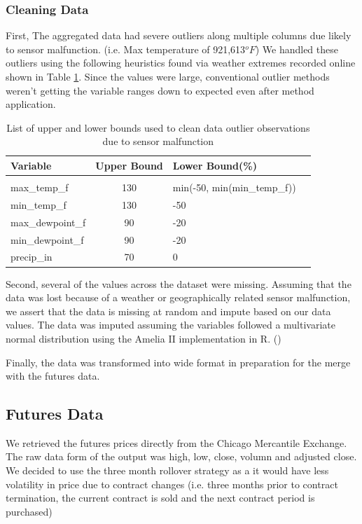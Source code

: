 \documentclass[twoside,11pt]{article}
\begin{document}
	\subsubsection{Cleaning Data}
	First, The aggregated data had severe outliers along multiple columns due likely to sensor malfunction. (i.e. Max temperature of 921,613$^oF$) We handled these outliers using the following heuristics found via weather extremes recorded online shown in Table \ref{tab:bounds}. Since the values were large, conventional outlier methods weren't getting the variable ranges down to expected even after method application.  

	\begin{table}[htbp]
		\centering
		\begin{tabular}{lclc}
			Variable & Upper Bound & Lower Bound(\%) \\
			\hline \\[-11pt]
			max\_temp\_f & 130 & min(-50, min(min\_temp\_f))\\
			min\_temp\_f & 130 & -50 \\
			max\_dewpoint\_f & 90 & -20\\
			min\_dewpoint\_f & 90 & -20\\
			precip\_in & 70 & 0\\
			\hline
		\end{tabular}
		\label{tab:bounds}
		\caption{List of upper and lower bounds used to clean data outlier observations due to sensor malfunction}
	\end{table}

	Second, several of the values across the dataset were missing. Assuming that the data was lost because of a weather or geographically related sensor malfunction, we assert that the data is missing at random and impute based on our data values. The data was imputed assuming the variables followed a multivariate normal distribution using the Amelia II implementation in R. (\cite{ameila})
	
	Finally, the data was transformed into wide format in preparation for the merge with the futures data. 

\subsection{Futures Data}
 
We retrieved the futures prices directly from the Chicago Mercantile Exchange. The raw data form of the output was high, low, close, volumn and adjusted close. We decided to use the three month rollover strategy as a it would have less volatility in price due to contract changes (i.e. three months prior to contract termination, the current contract is sold and the next contract period is purchased)
\end{document}
